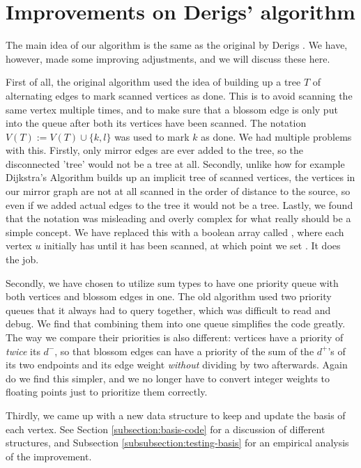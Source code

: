 \section{Improvements on Derigs' algorithm}
The main idea of our algorithm is the same as the original by Derigs \cite{source:derigs_shortest_odd_path}. We have, however, made some improving adjustments, and we will discuss these here.

First of all, the original algorithm used the idea of building up a tree $T$ of alternating edges to mark scanned vertices as done. This is to avoid scanning the same vertex multiple times, and to make sure that a blossom edge is only put into the queue after both its vertices have been scanned. The notation $V(T) := V(T) \cup \{k,l\}$ was used to mark $k$ as done. We had multiple problems with this. Firstly, only mirror edges are ever added to the tree, so the disconnected 'tree' would not be a tree at all. Secondly, unlike how for example Dijkstra's Algorithm builds up an implicit tree of scanned vertices, the vertices in our mirror graph are not at all scanned in the order of distance to the source, so even if we added actual edges to the tree it would not be a tree. Lastly, we found that the notation was misleading and overly complex for what really should be a simple concept. We have replaced this with a boolean array called , where each vertex $u$ initially has  until it has been scanned, at which point we set . It does the job.

Secondly, we have chosen to utilize sum types to have one priority queue with both vertices and blossom edges in one. The old algorithm used two priority queues that it always had to query together, which was difficult to read and debug. We find that combining them into one queue simplifies the code greatly. The way we compare their priorities is also different: vertices have a priority of \emph{twice} its $d^-$, so that blossom edges can have a priority of the sum of the $d^+$'s of its two endpoints and its edge weight \emph{without} dividing by two afterwards. Again do we find this simpler, and we no longer have to convert integer weights to floating points just to prioritize them correctly.

Thirdly, we came up with a new data structure to keep and update the basis of each vertex. See Section \ref{subsection:basis-code} for a discussion of different structures, and Subsection \ref{subsubsection:testing-basis} for an empirical analysis of the improvement.
